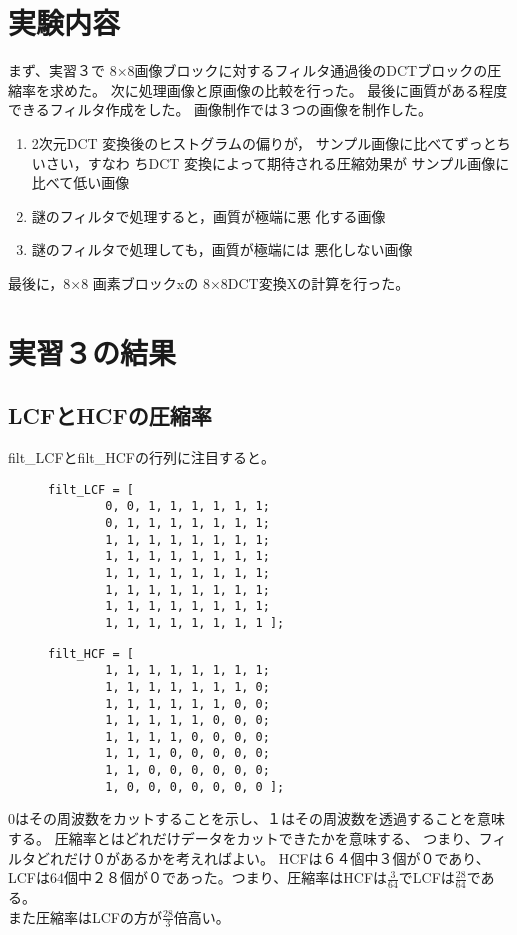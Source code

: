 \documentclass[a4j]{jsarticle}
\begin{document}
\section{実験内容}
まず、実習３で
8×8画像ブロックに対するフィルタ通過後のDCTブロックの圧縮率を求めた。
次に処理画像と原画像の比較を行った。
最後に画質がある程度できるフィルタ作成をした。
画像制作では３つの画像を制作した。
\begin{enumerate}
   \item 2次元DCT 変換後のヒストグラムの偏りが，
  サンプル画像に比べてずっとちいさい，すなわ
  ちDCT 変換によって期待される圧縮効果が
  サンプル画像に比べて低い画像
   \item 謎のフィルタで処理すると，画質が極端に悪
  化する画像
   \item 謎のフィルタで処理しても，画質が極端には
  悪化しない画像
\end{enumerate}

最後に，8×8 画素ブロックxの
8×8DCT変換Xの計算を行った。

\section{実習３の結果}
\subsection{LCFとHCFの圧縮率}
filt\_LCFとfilt\_HCFの行列に注目すると。

\begin{figure}
  \begin{verbatim}
filt_LCF = [
        0, 0, 1, 1, 1, 1, 1, 1;
        0, 1, 1, 1, 1, 1, 1, 1;
        1, 1, 1, 1, 1, 1, 1, 1;
        1, 1, 1, 1, 1, 1, 1, 1;
        1, 1, 1, 1, 1, 1, 1, 1;
        1, 1, 1, 1, 1, 1, 1, 1;
        1, 1, 1, 1, 1, 1, 1, 1;
        1, 1, 1, 1, 1, 1, 1, 1 ];
  \end{verbatim}
\end{figure}

\begin{figure}
  \begin{verbatim}
filt_HCF = [
        1, 1, 1, 1, 1, 1, 1, 1;
        1, 1, 1, 1, 1, 1, 1, 0;
        1, 1, 1, 1, 1, 1, 0, 0;
        1, 1, 1, 1, 1, 0, 0, 0;
        1, 1, 1, 1, 0, 0, 0, 0;
        1, 1, 1, 0, 0, 0, 0, 0;
        1, 1, 0, 0, 0, 0, 0, 0;
        1, 0, 0, 0, 0, 0, 0, 0 ];
  \end{verbatim}
\end{figure}
0はその周波数をカットすることを示し、１はその周波数を透過することを意味する。
圧縮率とはどれだけデータをカットできたかを意味する、
つまり、フィルタどれだけ０があるかを考えればよい。
HCFは６４個中３個が０であり、LCFは64個中２８個が０であった。つまり、圧縮率はHCFは$\frac{3}{64}$でLCFは$\frac{28}{64}$である。\\
また圧縮率はLCFの方が$\frac{28}{3}$倍高い。
\end{document}

